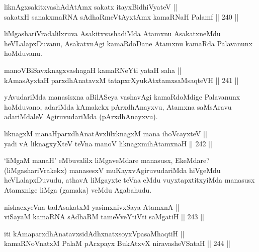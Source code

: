 \begin{shl}
liknAgxsakitxvashAdAtAmx sakatx itayxBidhiVyateV || \\
sakatxH sanakxmaRNA sAdhaRmeVtAyxtAmx kamaRNaH Palamf \hfill || 240 ||  
\end{shl}

\begin{artha}
liMgashariVradalilxruva AsakitxvashadiMda Atamxnu AsakatxneMdu
heVLalapxDuvanu, AsakatxnAgi kamaRdoDane Atamxnu kamaRda Palavanunx
hoMduvanu.
\end{artha}

\begin{shl}
manoVBiSavxknagxvashagaH kamaRNeYti yataH saha || \\
kAmasAyxtaH parxdhAnatavxM tatapxrXyukAtxtamxsaMsaqteVH \hfill || 241 ||  
\end{shl}

\begin{artha}
yAvudariMda manasisxna aBilASeya vashavAgi kamaRdoMdige
Palavanunx hoMduvano, adariMda kAmakekx pArxdhAnayxvu, Atamxna
saMsAravu adariMdaleV AgiruvudariMda (pArxdhAnayxvu).
\end{artha}


\begin{shl}
liknagxM manaHparxdhAnatAvxlilxknagxM mana ihoVcayxteV || \\
yadi vA liknagxyXteV teVna manoV liknagxmihA\s \s tamxnaH \hfill || 242 ||  
\end{shl}

\begin{artha}
`liMgaM manaH' eMbuvalilx liMgaveMdare manasusx, EkeMdare?
(liMgashariVrakekx) manasesxV muKayxvAgiruvudariMda hiVgeMdu
heVLalapxDuvudu, athavA liMgayxte teVna eMdu vuyxtapxtitxyiMda
manasusx Atamxnige liMga (gamaka) veMdu Agabahudu.
\end{artha}

\begin{shl}
nishacxyeVna tadAsakatxM yasimxnivxSaya AtamxnA || \\
viSayaM kamaRNA sAdhaRM tameVveYtiVti saMgatiH \hfill || 243 ||  
\end{shl}

\begin{shl}
iti kAmaparxdhAnatavxsidAdhxnatxsoyxVpasaMhaqtiH || \\
kamaRNoV\s natxM PalaM pArxpayx BukAtxvX niravasheVSataH \hfill || 244 ||  
\end{shl}

